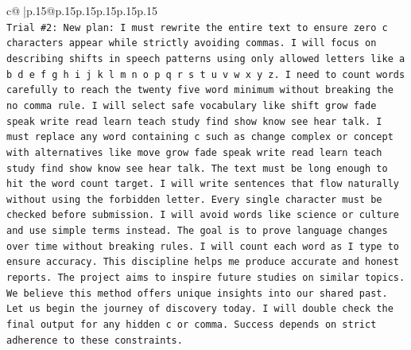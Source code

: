 \documentclass{article}
\begin{document}
{\begin{supertabular}{c@{$\;$}|p{.15\linewidth}@{}p{.15\linewidth}p{.15\linewidth}p{.15\linewidth}p{.15\linewidth}p{.15\linewidth}}
{{{\\ 
\texttt{Trial \#2: New plan: I must rewrite the entire text to ensure zero c characters appear while strictly avoiding commas. I will focus on describing shifts in speech patterns using only allowed letters like a b d e f g h i j k l m n o p q r s t u v w x y z. I need to count words carefully to reach the twenty five word minimum without breaking the no comma rule. I will select safe vocabulary like shift grow fade speak write read learn teach study find show know see hear talk. I must replace any word containing c such as change complex or concept with alternatives like move grow fade speak write read learn teach study find show know see hear talk. The text must be long enough to hit the word count target. I will write sentences that flow naturally without using the forbidden letter. Every single character must be checked before submission. I will avoid words like science or culture and use simple terms instead. The goal is to prove language changes over time without breaking rules. I will count each word as I type to ensure accuracy. This discipline helps me produce accurate and honest reports. The project aims to inspire future studies on similar topics. We believe this method offers unique insights into our shared past. Let us begin the journey of discovery today. I will double check the final output for any hidden c or comma. Success depends on strict adherence to these constraints.} \\
\\ 
}}}
\end{supertabular}}
\end{document}

